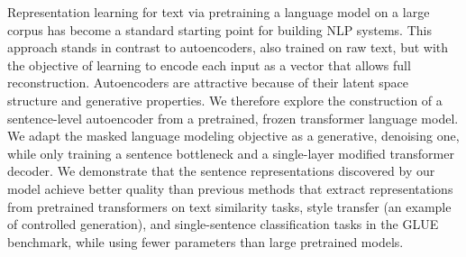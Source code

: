Representation learning for text via pretraining a language model on a large corpus has become a standard starting point for building NLP systems.  This approach stands in contrast to autoencoders, also trained on raw text, but with the objective of learning to encode each input as a vector that allows full reconstruction.  Autoencoders are attractive because of their latent space structure and generative properties. We therefore explore the construction of a sentence-level autoencoder from a pretrained, frozen transformer language model. We adapt the masked language modeling objective as a generative, denoising one, while only training a sentence bottleneck and a single-layer modified transformer decoder. We demonstrate that the sentence representations discovered by our model achieve better quality than previous methods that extract representations from pretrained transformers on text similarity tasks, style transfer (an example of controlled generation), and single-sentence classification tasks in the GLUE benchmark, while using fewer parameters than large pretrained models.
